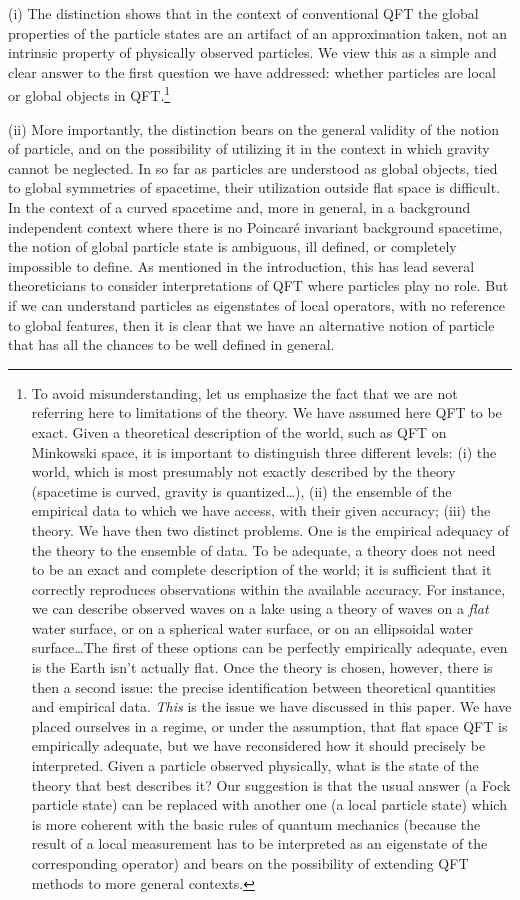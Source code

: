 \documentclass[11pt, nofootinbib]{revtex4-2}
\begin{document}
(i) The distinction shows that in the context of conventional QFT the
global properties of the particle states are an artifact of an
approximation taken, not an intrinsic property of physically observed
particles.  We view this as a simple and clear answer to the first
question we have addressed: whether particles are local or global
objects in QFT.\footnote{To avoid misunderstanding, let us emphasize
the fact that we are not referring here to limitations of the theory. 
We have assumed here QFT to be exact.  Given a theoretical description
of the world, such as QFT on Minkowski space, it is important to
distinguish three different levels: (i) the world, which is most
presumably not exactly described by the theory (spacetime is curved,
gravity is quantized\ldots), (ii) the ensemble of the empirical data
to which we have access, with their given accuracy; (iii) the theory. 
We have then two distinct problems.  One is the empirical adequacy of
the theory to the ensemble of data.  To be adequate, a theory does not
need to be an exact and complete description of the world; it is
sufficient that it correctly reproduces observations within the
available accuracy.  For instance, we can describe observed waves on a
lake using a theory of waves on a \emph{flat} water surface, or on a
spherical water surface, or on an ellipsoidal water surface\ldots The
first of these options can be perfectly empirically adequate, even is
the Earth isn't actually flat.  Once the theory is chosen, however,
there is then a second issue: the precise identification between
theoretical quantities and empirical data.  \emph{This} is the issue
we have discussed in this paper.  We have placed ourselves in a
regime, or under the assumption, that flat space QFT is empirically
adequate, but we have reconsidered how it should precisely be
interpreted.  Given a particle observed physically, what is the state
of the theory that best describes it?  Our suggestion is that the
usual answer (a Fock particle state) can be replaced with another one
(a local particle state) which is more coherent with the basic rules
of quantum mechanics (because the result of a local measurement has to
be interpreted as an eigenstate of the corresponding operator) and
bears on the possibility of extending QFT methods to more general
contexts.}
%

(ii) More importantly, the distinction bears on the general validity
of the notion of particle, and on the possibility of utilizing it in
the context in which gravity cannot be neglected.  In so far as
particles are understood as global objects, tied to global
symmetries of spacetime, their utilization outside flat space is
difficult.  In the context of a curved spacetime and, more in general,
in a background independent context where there is no Poincar\'e
invariant background spacetime, the notion of global particle state is
ambiguous, ill defined, or completely impossible to define.  As
mentioned in the introduction, this has lead several theoreticians to
consider interpretations of QFT where particles play no role.  But if
we can understand particles as eigenstates of local operators, with no
reference to global features, then it is clear that we have an
alternative notion of particle that has all the chances to be well
defined in general.  
\end{document}
